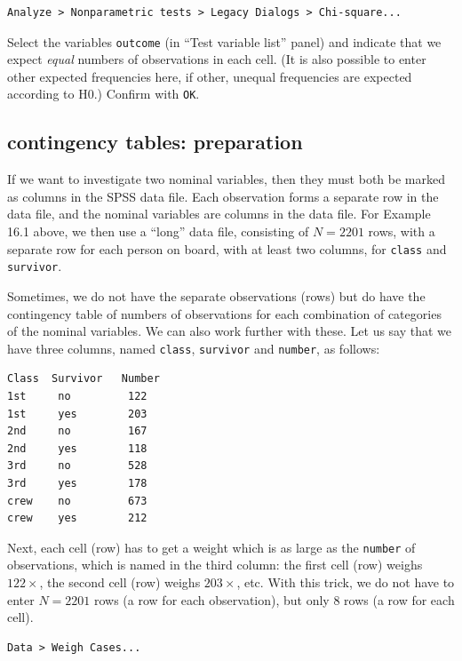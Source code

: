 \documentclass[
]{book}
\begin{document}
\begin{verbatim}
Analyze > Nonparametric tests > Legacy Dialogs > Chi-square...
\end{verbatim}

Select the variables \texttt{outcome} (in ``Test variable list'' panel) and
indicate that we expect \emph{equal} numbers of observations in each cell.
(It is also possible to enter other expected frequencies here,
if other, unequal frequencies are expected according to H0.)
Confirm with \texttt{OK}.

\hypertarget{contingency-tables-preparation}{%
\subsection{contingency tables: preparation}\label{contingency-tables-preparation}}

If we want to investigate two nominal variables, then they must
both be marked as columns in the SPSS data file. Each observation
forms a separate row in the data file, and the nominal variables
are columns in the data file. For Example 16.1 above, we then use a ``long''
data file, consisting of \(N=2201\) rows, with a separate row for each person
on board, with at least two columns, for \texttt{class} and
\texttt{survivor}.

Sometimes, we do not have the separate observations (rows) but
do have the contingency table of numbers of observations for each
combination of categories of the nominal variables. We can also
work further with these. Let us say that we have three columns, named
\texttt{class}, \texttt{survivor} and \texttt{number}, as follows:

\begin{verbatim}
Class  Survivor   Number
1st     no         122
1st     yes        203
2nd     no         167
2nd     yes        118
3rd     no         528
3rd     yes        178
crew    no         673
crew    yes        212
\end{verbatim}

Next, each cell (row) has to get a weight which is as large as
the \texttt{number} of observations, which is named in the third column: the
first cell (row) weighs \(122\times\), the second cell (row) weighs
\(203\times\), etc. With this trick, we do not have to enter \(N=2201\) rows
(a row for each observation), but only 8 rows (a row
for each cell).

\begin{verbatim}
Data > Weigh Cases... 
\end{verbatim}
\end{document}
